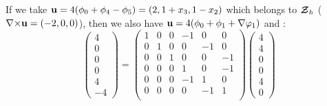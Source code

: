 If we take ${\mathbf{u}}=4(\phi_0+\phi_4-\phi_5)=(2,1+x_3,1-x_2)$ which belongs to
${\bm{\mathcal{Z}}}_h$ (${\nabla\times}{\mathbf{u}}=(-2,0,0)$), then we
also have ${\mathbf{u}}=4(\phi_0+\phi_1+{\nabla}\varphi_1)$ and :
\[ \begin{pmatrix}
4\\0\\0\\0\\4\\-4
\end{pmatrix} = \begin{pmatrix}
1 & 0 & 0 & -1 & 0 & 0\\
0 & 1 & 0 & 0 & -1 & 0\\
0 & 0 & 1 & 0 & 0 & -1\\
0 & 0 & 0 & 1 & 0 & -1\\
0 & 0 & 0 & -1 & 1 & 0\\
0 & 0 & 0 & 0 & -1 & 1\\
\end{pmatrix} \begin{pmatrix}
4\\4\\0\\0\\4\\0
\end{pmatrix} \]

